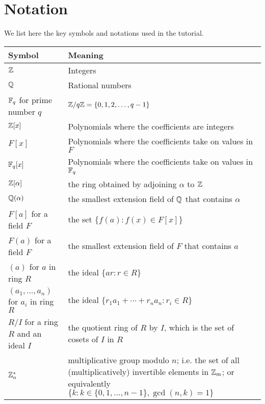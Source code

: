 \documentclass[../main.tex]{subfiles}
\begin{document}
\newpage
\section{Notation}

We list here the key symbols and notations used in the tutorial.

\begin{table}[!htbp]
    \centering
    \begin{tabular}{|p{}|p{}|}
    \hline
    Symbol & Meaning \\
    \hline \hline
        $\mathbb{Z}$ & Integers \\
        \hline
        $\mathbb{Q}$ & Rational numbers \\
        \hline
        $\mathbb{F}_q$ for prime number $q$ & $\mathbb{Z}/q \mathbb{Z}= \{0, 1, 2, \ldots, q-1\}$   \\
        \hline
        $\mathbb{Z}[x]$ & Polynomials where the coefficients are integers \\
        \hline
        $F[x]$ & Polynomials where the coefficients take on values in $F$ \\
        \hline
        $\mathbb{F}_q[x]$ & Polynomials where the coefficients take on values in $\mathbb{F}_q$ \\
        \hline
        $\mathbb{Z}[\alpha]$ & the ring obtained by adjoining\index{adjoin} $\alpha$ to $\mathbb{Z}$ \\%
        \hline
        $\mathbb{Q}(\alpha)$ & the smallest extension field of $\mathbb{Q}$ that contains $\alpha$ \\ %
        \hline
        $F[a]$ for a field $F$ & the set $\{ f(a) : f(x) \in F[x] \}$ \\
        \hline
        $F(a)$ for a field $F$ & the smallest extension field of $F$ that contains $a$ \\
        \hline
        $(a)$ for $a$ in ring $R$ & the ideal $\{ ar : r \in R\}$ \\ 
        \hline
        $(a_1,\ldots,a_n)$ for $a_i$ in ring $R$ & the ideal $\{ r_1 a_1 + \cdots + r_n a_n : r_i \in R \}$ \\
        \hline
        $R/I$ for a ring $R$ and an ideal $I$ & the quotient ring\index{quotient ring} of $R$ by $I$, which is the set of cosets of $I$ in $R$ \\
        \hline
        $\mathbb{Z}_n^*$ & multiplicative group modulo $n$; i.e. the set of all (multiplicatively) invertible elements in $\mathbb{Z}_m$; or equivalently $\{ k : k \in \{0,1,\ldots,n-1\}, \gcd(n,k) = 1 \}$ \\

\end{tabular}
\end{table}
\end{document}
